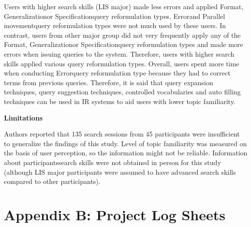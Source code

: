 \documentclass[]{article}
\begin{document}
\begin{enumerate}
Users with higher search skills (LIS major) made less errors and applied \textquotesingle Format\textquotesingle, \textquotesingle Generalization\textquotesingle or \textquotesingle Specification\textquotesingle query reformulation types. \textquotesingle Error\textquotesingle and \textquotesingle Parallel movement\textquotesingle query reformulation types were not much used by these users. In contrast, users from other major group did not very frequently apply any of the \textquotesingle Format\textquotesingle, \textquotesingle Generalization\textquotesingle or \textquotesingle Specification\textquotesingle query reformulation types and made more errors when issuing queries to the system. Therefore, users with higher search skills applied various query reformulation types. Overall, users spent more time when conducting \textquotesingle Error\textquotesingle query reformulation type because they had to correct terms from previous queries. Therefore, it is said that query expansion techniques, query suggestion techniques, controlled vocabularies and auto filling techniques can be used in IR systems to aid users with lower topic familiarity.                   

\textbf{Limitations}

Authors reported that 135 search sessions from 45 participants were insufficient to generalize the findings of this study. Level of topic familiarity was measured on the basis of user perception, so the information might not be reliable. Information about participants\textquotesingle search skills were not obtained in person for this study (although LIS major participants were assumed to have advanced search skills compared to other participants).  

\end{enumerate}

\section*{Appendix B: Project Log Sheets} 

	
\end{document}
